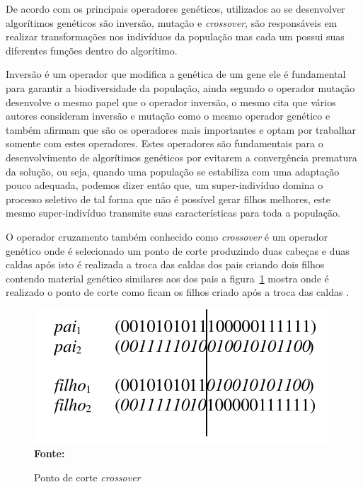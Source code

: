 \documentclass{abntpuc}
\begin{document}
De acordo com \cite{goes2005otimizaccao} os principais operadores genéticos, utilizados ao se desenvolver algorítimos genéticos são inversão, mutação e \textit{crossover}, são responsáveis em realizar transformações nos indivíduos da população mas cada um possui suas diferentes funções dentro do algorítimo.\par
Inversão é um operador que modifica a genética de um gene ele é fundamental para garantir a biodiversidade da população, ainda segundo \cite{goes2005otimizaccao} o operador mutação  desenvolve o mesmo papel que o operador inversão, o mesmo cita que vários autores consideram inversão e mutação como o mesmo operador genético e também afirmam que são os operadores mais importantes e optam por trabalhar somente com estes operadores. Estes operadores são fundamentais para o desenvolvimento de algorítimos genéticos por evitarem a convergência prematura da solução, ou seja, quando uma população se estabiliza com uma adaptação pouco adequada, podemos dizer então que, um super-indivíduo domina o processo seletivo de tal forma que não é possível gerar filhos melhores, este mesmo super-indivíduo transmite suas características para toda a população.\par

O operador cruzamento também conhecido como \textit{crossover} é um operador genético onde é selecionado um ponto de corte produzindo duas cabeças e duas caldas após isto é realizada a troca das caldas dos pais criando dois filhos contendo material genético similares aos dos pais a figura~\ref{fig:pontoCorteAG} mostra onde é realizado o ponto de corte como ficam os filhos criado após a troca das caldas \cite{de1999introduccao}.

\begin{figure}[!htb]
\caption[Ponto de corte \textit{crossover}]{Ponto de corte \textit{crossover}}
\label{fig:pontoCorteAG}
\centering
\includegraphics[scale=0.6]{imagens/crossoverAG.png}
\\ \textbf{\footnotesize Fonte: \cite{de1999introduccao}}
\end{figure}
\end{document}
